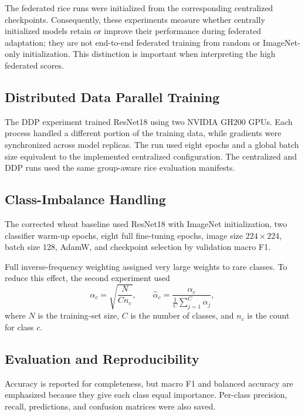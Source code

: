 \documentclass[conference]{IEEEtran}
\begin{document}
The federated rice runs were initialized from the corresponding centralized checkpoints. Consequently, these experiments measure whether centrally initialized models retain or improve their performance during federated adaptation; they are not end-to-end federated training from random or ImageNet-only initialization. This distinction is important when interpreting the high federated scores.

\subsection{Distributed Data Parallel Training}

The DDP experiment trained ResNet18 using two NVIDIA GH200 GPUs. Each process handled a different portion of the training data, while gradients were synchronized across model replicas. The run used eight epochs and a global batch size equivalent to the implemented centralized configuration. The centralized and DDP runs used the same group-aware rice evaluation manifests.

\subsection{Class-Imbalance Handling}

The corrected wheat baseline used ResNet18 with ImageNet initialization, two classifier warm-up epochs, eight full fine-tuning epochs, image size $224\times224$, batch size 128, AdamW, and checkpoint selection by validation macro F1.

Full inverse-frequency weighting assigned very large weights to rare classes. To reduce this effect, the second experiment used
\begin{equation}
\alpha_c =
\sqrt{\frac{N}{C n_c}},
\qquad
\hat{\alpha}_c =
\frac{\alpha_c}
{\frac{1}{C}\sum_{j=1}^{C}\alpha_j},
\label{eq:sqrtweights}
\end{equation}
where $N$ is the training-set size, $C$ is the number of classes, and $n_c$ is the count for class $c$.

\subsection{Evaluation and Reproducibility}

Accuracy is reported for completeness, but macro F1 and balanced accuracy are emphasized because they give each class equal importance. Per-class precision, recall, predictions, and confusion matrices were also saved.
\end{document}

